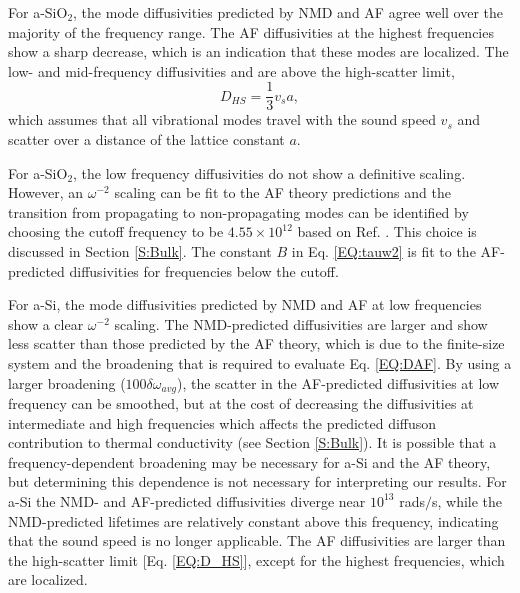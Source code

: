 \documentclass[aps,prb,onecolumn,preprint,superscriptaddress,footinbib,amsmath,amssymb,floatfix]{revtex4}
\begin{document}
For a-SiO$_2$, the mode diffusivities predicted by NMD and AF agree 
well over the majority of the frequency range. The AF diffusivities at 
the highest frequencies 
show a sharp decrease, which is an indication 
that these modes are localized.\cite{feldman_thermal_1993} 
The low- and mid-frequency diffusivities and are above the 
high-scatter limit, 
\begin{equation}\label{EQ:D_HS}
D_{HS} = \frac{1}{3} v_s a,
\end{equation}
which assumes that all vibrational modes travel with the sound speed  
$v_s$ and scatter over a distance of the lattice constant $a$.
\cite{cahill_lattice_1988} 

For a-SiO$_2$, the low frequency diffusivities do not show a 
definitive scaling. However, an $\omega^{-2}$ scaling can be fit 
to the AF theory predictions and the transition from 
propagating to non-propagating modes can be identified by 
choosing the cutoff frequency to be $4.55\times10^{12}$ 
based on Ref. . 
This choice is discussed in Section \ref{S:Bulk}. The constant 
$B$ in Eq. \eqref{EQ:tauw2} 
is fit to the AF-predicted diffusivities for 
frequencies below the cutoff. 

For a-Si, the mode diffusivities predicted by NMD and AF at 
low frequencies show a clear $\omega^{-2}$ scaling. 
The NMD-predicted diffusivities are larger and show less 
scatter than those predicted by the AF theory, which is due to 
the finite-size system and the broadening that is 
required to evaluate 
Eq. \eqref{EQ:DAF}.\cite{feldman_thermal_1993} By using a larger 
broadening ($100\delta\omega_{avg}$), the scatter 
in the AF-predicted 
diffusivities at low frequency can be smoothed, but at the cost of 
decreasing the diffusivities at intermediate and 
high frequencies which 
affects the predicted diffuson contribution to thermal conductivity 
(see Section \ref{S:Bulk}). 
It is possible that a frequency-dependent broadening may be necessary 
for a-Si and the AF theory,  
but determining this dependence is not necessary for 
interpreting our results. 
For a-Si the NMD- and AF-predicted diffusivities diverge 
near $10^{13}$ rads$/$s, while the NMD-predicted lifetimes 
are relatively constant above this frequency, 
indicating that the sound speed is no longer 
applicable. The AF diffusivities are 
larger than the high-scatter limit [Eq. \eqref{EQ:D_HS}], 
except for the 
highest frequencies, which are localized.\cite{feldman_thermal_1993} 
\end{document}
